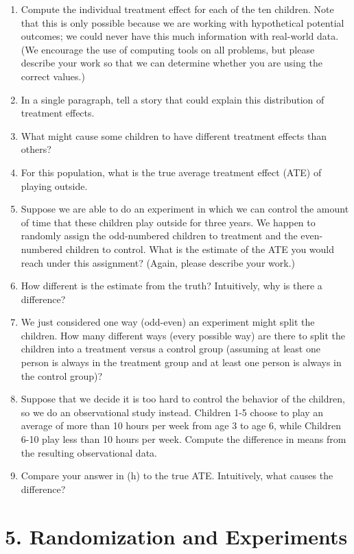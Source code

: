 \documentclass[]{article}
\begin{document}
\begin{enumerate}
\def\labelenumi{\alph{enumi}.}
\item
  Compute the individual treatment effect for each of the ten children.
  Note that this is only possible because we are working with
  hypothetical potential outcomes; we could never have this much
  information with real-world data. (We encourage the use of computing
  tools on all problems, but please describe your work so that we can
  determine whether you are using the correct values.)
\item
  In a single paragraph, tell a story that could explain this
  distribution of treatment effects.
\item
  What might cause some children to have different treatment effects
  than others?
\item
  For this population, what is the true average treatment effect (ATE)
  of playing outside.
\item
  Suppose we are able to do an experiment in which we can control the
  amount of time that these children play outside for three years. We
  happen to randomly assign the odd-numbered children to treatment and
  the even-numbered children to control. What is the estimate of the ATE
  you would reach under this assignment? (Again, please describe your
  work.)
\item
  How different is the estimate from the truth? Intuitively, why is
  there a difference?
\item
  We just considered one way (odd-even) an experiment might split the
  children. How many different ways (every possible way) are there to
  split the children into a treatment versus a control group (assuming
  at least one person is always in the treatment group and at least one
  person is always in the control group)?
\item
  Suppose that we decide it is too hard to control the behavior of the
  children, so we do an observational study instead. Children 1-5 choose
  to play an average of more than 10 hours per week from age 3 to age 6,
  while Children 6-10 play less than 10 hours per week. Compute the
  difference in means from the resulting observational data.
\item
  Compare your answer in (h) to the true ATE. Intuitively, what causes
  the difference?
\end{enumerate}

\section{5. Randomization and
Experiments}\label{randomization-and-experiments}
\end{document}
